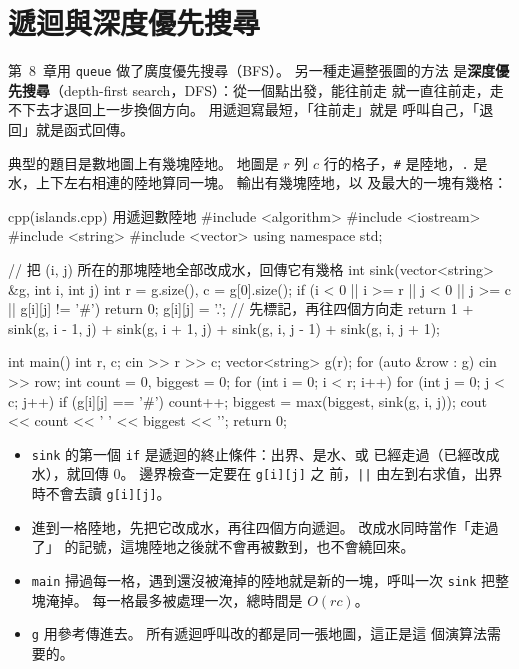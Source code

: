 \section{遞迴與深度優先搜尋}
\label{sec:dfs}

第~8~章用 \texttt{queue} 做了廣度優先搜尋（BFS）。 另一種走遍整張圖的方法
是\textbf{深度優先搜尋}（depth-first search，DFS）：從一個點出發，能往前走
就一直往前走，走不下去才退回上一步換個方向。 用遞迴寫最短，「往前走」就是
呼叫自己，「退回」就是函式回傳。

典型的題目是數地圖上有幾塊陸地。 地圖是 $r$ 列 $c$ 行的格子，\texttt{\#}
是陸地，\texttt{.} 是水，上下左右相連的陸地算同一塊。 輸出有幾塊陸地，以
及最大的一塊有幾格：

\begin{example}[label=ex:islands]{cpp}{(islands.cpp) 用遞迴數陸地}
#include <algorithm>
#include <iostream>
#include <string>
#include <vector>
using namespace std;

// 把 (i, j) 所在的那塊陸地全部改成水，回傳它有幾格
int sink(vector<string> &g, int i, int j) {
    int r = g.size(), c = g[0].size();
    if (i < 0 || i >= r || j < 0 || j >= c || g[i][j] != '#') {
        return 0;
    }
    g[i][j] = '.';                         // 先標記，再往四個方向走
    return 1 + sink(g, i - 1, j) + sink(g, i + 1, j) +
           sink(g, i, j - 1) + sink(g, i, j + 1);
}

int main() {
    int r, c;
    cin >> r >> c;
    vector<string> g(r);
    for (auto &row : g) {
        cin >> row;
    }
    int count = 0, biggest = 0;
    for (int i = 0; i < r; i++) {
        for (int j = 0; j < c; j++) {
            if (g[i][j] == '#') {
                count++;
                biggest = max(biggest, sink(g, i, j));
            }
        }
    }
    cout << count << ' ' << biggest << '\n';
    return 0;
}
\end{example}


\begin{itemize}
\item \texttt{sink} 的第一個 \texttt{if} 是遞迴的終止條件：出界、是水、或
已經走過（已經改成水），就回傳 $0$。 邊界檢查一定要在 \texttt{g[i][j]} 之
前，\texttt{||} 由左到右求值，出界時不會去讀 \texttt{g[i][j]}。
\item 進到一格陸地，先把它改成水，再往四個方向遞迴。 改成水同時當作「走過了」
的記號，這塊陸地之後就不會再被數到，也不會繞回來。
\item \texttt{main} 掃過每一格，遇到還沒被淹掉的陸地就是新的一塊，呼叫一次
\texttt{sink} 把整塊淹掉。 每一格最多被處理一次，總時間是 $O(rc)$。
\item \texttt{g} 用參考傳進去。 所有遞迴呼叫改的都是同一張地圖，這正是這
個演算法需要的。
\end{itemize}


